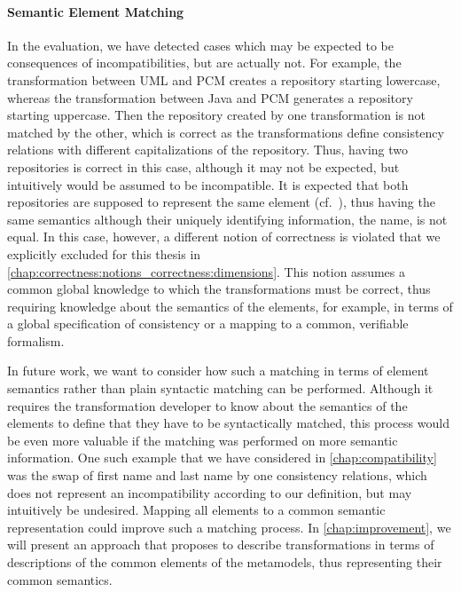 \paragraph{Semantic Element Matching}
In the evaluation, we have detected cases which may be expected to be consequences of incompatibilities, but are actually not.
For example, the transformation between \gls{UML} and \gls{PCM} creates a repository starting lowercase, whereas the transformation between Java and \gls{PCM} generates a repository starting uppercase.
Then the repository created by one transformation is not matched by the other, which is correct as the transformations define consistency relations with different capitalizations of the repository.
Thus, having two repositories is correct in this case, although it may not be expected, but intuitively would be assumed to be incompatible.
It is expected that both repositories are supposed to represent the same element (cf.~\cite[Figure 6.4]{saglam2020ma}), thus having the same semantics although their uniquely identifying information, the name, is not equal.
In this case, however, a different notion of correctness is violated that we explicitly excluded for this thesis in \autoref{chap:correctness:notions_correctness:dimensions}.
This notion assumes a common global knowledge to which the transformations must be correct, thus requiring knowledge about the semantics of the elements, for example, in terms of a global specification of consistency or a mapping to a common, verifiable formalism.

In future work, we want to consider how such a matching in terms of element semantics rather than plain syntactic matching can be performed. 
Although it requires the transformation developer to know about the semantics of the elements to define that they have to be syntactically matched, this process would be even more valuable if the matching was performed on more semantic information.
One such example that we have considered in \autoref{chap:compatibility} was the swap of first name and last name by one consistency relations, which does not represent an incompatibility according to our definition, but may intuitively be undesired.
Mapping all elements to a common semantic representation could improve such a matching process.
In \autoref{chap:improvement}, we will present an approach that proposes to describe transformations in terms of descriptions of the common elements of the metamodels, thus representing their common semantics.

